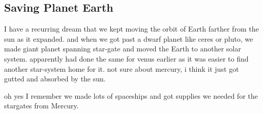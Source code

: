 \subsection{Saving Planet Earth}
I have a recurring dream that we kept moving the orbit of Earth farther from the sun
as it expanded. and when we got past a dwarf planet like ceres or pluto, we made
giant planet spanning star-gate and moved the Earth to another solar system.
apparently had done the same for venus earlier as it was easier to find another
star-system home for it. not sure about mercury, i think it just got gutted and
absorbed by the sun.

oh yes I remember we made lots of spaceships and got supplies we needed for the
stargates from Mercury.

